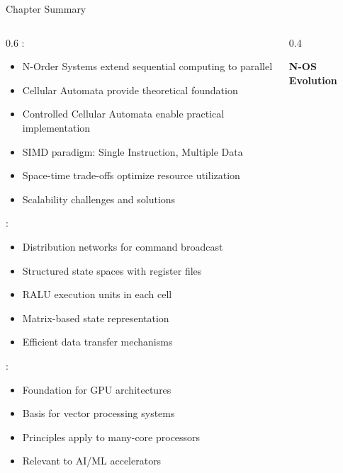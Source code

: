 \begin{frame}{Chapter Summary}
\begin{columns}
\begin{column}{0.6\textwidth}
:
\begin{itemize}
\item N-Order Systems extend sequential computing to parallel
\item Cellular Automata provide theoretical foundation
\item Controlled Cellular Automata enable practical implementation
\item SIMD paradigm: Single Instruction, Multiple Data
\item Space-time trade-offs optimize resource utilization
\item Scalability challenges and solutions
\end{itemize}

\vspace{0.3cm}
:
\begin{itemize}
\item Distribution networks for command broadcast
\item Structured state spaces with register files
\item RALU execution units in each cell
\item Matrix-based state representation
\item Efficient data transfer mechanisms
\end{itemize}

\vspace{0.3cm}
:
\begin{itemize}
\item Foundation for GPU architectures
\item Basis for vector processing systems
\item Principles apply to many-core processors
\item Relevant to AI/ML accelerators
\end{itemize}
\end{column}
\begin{column}{0.4\textwidth}
\begin{center}
\textbf{N-OS Evolution}
\vspace{0.3cm}

\end{center}
\end{column}
\end{columns}
\end{frame}

